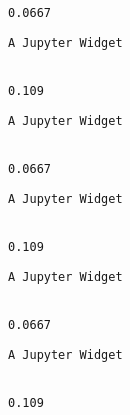 \documentclass[11pt]{article}
\begin{document}
    
    \begin{Verbatim}[commandchars=\\\{\}]

0.0667

    \end{Verbatim}

    
    \begin{verbatim}
A Jupyter Widget
    \end{verbatim}

    
    \begin{Verbatim}[commandchars=\\\{\}]

0.109

    \end{Verbatim}

    
    \begin{verbatim}
A Jupyter Widget
    \end{verbatim}

    
    \begin{Verbatim}[commandchars=\\\{\}]

0.0667

    \end{Verbatim}

    
    \begin{verbatim}
A Jupyter Widget
    \end{verbatim}

    
    \begin{Verbatim}[commandchars=\\\{\}]

0.109

    \end{Verbatim}

    
    \begin{verbatim}
A Jupyter Widget
    \end{verbatim}

    
    \begin{Verbatim}[commandchars=\\\{\}]

0.0667

    \end{Verbatim}

    
    \begin{verbatim}
A Jupyter Widget
    \end{verbatim}

    
    \begin{Verbatim}[commandchars=\\\{\}]

0.109

    \end{Verbatim}
\end{document}
